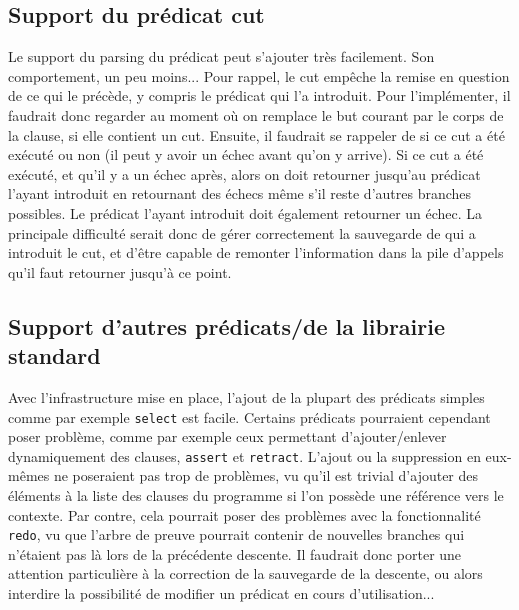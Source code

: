 \documentclass[../report.tex]{subfiles}
\begin{document}
\subsection{Support du prédicat cut}
Le support du parsing du prédicat peut s'ajouter très facilement. Son comportement, un peu moins... Pour rappel, le cut empêche la remise en question de ce qui le précède, y compris le prédicat qui l'a introduit. Pour l'implémenter, il faudrait donc regarder au moment où on remplace le but courant par le corps de la clause, si elle contient un cut. Ensuite, il faudrait se rappeler de si ce cut a été exécuté ou non (il peut y avoir un échec avant qu'on y arrive). Si ce cut a été exécuté, et qu'il y a un échec après, alors on doit retourner jusqu'au prédicat l'ayant introduit en retournant des échecs même s'il reste d'autres branches possibles. Le prédicat l'ayant introduit doit également retourner un échec. La principale difficulté serait donc de gérer correctement la sauvegarde de qui a introduit le cut, et d'être capable de remonter l'information dans la pile d'appels qu'il faut retourner jusqu'à ce point. 
\subsection{Support d'autres prédicats/de la librairie standard}
Avec l'infrastructure mise en place, l'ajout de la plupart des prédicats simples comme par exemple \texttt{select} est facile. Certains prédicats pourraient cependant poser problème, comme par exemple ceux permettant d'ajouter/enlever dynamiquement des clauses, \texttt{assert} et \texttt{retract}. L'ajout ou la suppression en eux-mêmes ne poseraient pas trop de problèmes, vu qu'il est trivial d'ajouter des éléments à la liste des clauses du programme si l'on possède une référence vers le contexte. Par contre, cela pourrait poser des problèmes avec la fonctionnalité \texttt{redo}, vu que l'arbre de preuve pourrait contenir de nouvelles branches qui n'étaient pas là lors de la précédente descente. Il faudrait donc porter une attention particulière à la correction de la sauvegarde de la descente, ou alors interdire la possibilité de modifier un prédicat en cours d'utilisation...
\end{document}

